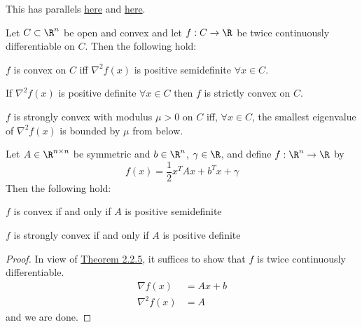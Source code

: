 This has parallels \href{a114065}{here} and \href{cd9cea7}{here}.

\label{eeb9c30}

Let $C\subset\R^n$ be open and convex and let $f:C\to\R$ be twice continuously
differentiable on $C$. Then the following hold:
\begin{enumerata}
  \def\allx{\forall x\in C}
  \def\hessian{\nabla^2f(x)}
  \item $f$ is convex on $C$ iff $\hessian$ is positive
  semidefinite $\allx$.
  \item If $\hessian$ is positive definite $\allx$ then $f$ is strictly convex on $C$.
  \item $f$ is strongly convex with modulus $\mu>0$ on $C$ iff,
  $\allx$, the smallest eigenvalue of $\hessian$ is bounded by $\mu$
  from below.
\end{enumerata}

\label{de25005}

Let $A\in\R^{n\times n}$ be symmetric and $b\in\R^n$, $\gamma\in\R$, and define
$f:\R^n\to\R$ by
$$
  f(x)=\frac12x^TAx+b^Tx+\gamma
$$
Then the following hold:
\begin{enumerata}
  \item $f$ is convex if and only if $A$ is positive semidefinite
  \item $f$ is strongly convex if and only if $A$ is positive definite
\end{enumerata}

\begin{proof}

  In view of \href{eeb9c30}{Theorem 2.2.5}, it suffices to show that $f$ is twice
  continuously differentiable.
  \begin{align*}
    \nabla f(x)  &= Ax + b \\
    \nabla^2f(x) &= A
  \end{align*}
  and we are done.
\end{proof}

\label{f546fc9}

